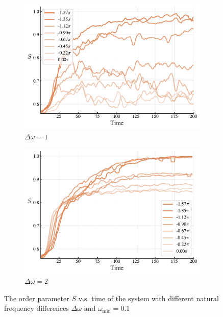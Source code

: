 \documentclass{article}
\begin{document}
\begin{figure}[H]
    \centering
    \begin{subfigure}{0.45\textwidth}
        \centering
        \includegraphics[width=1\textwidth]{figs/S_l0.15_d0.5_dO1_S.pdf}
        \caption{$\Delta \omega=1$}
    \end{subfigure}
    \begin{subfigure}{0.45\textwidth}
        \centering
        \includegraphics[width=1\textwidth]{figs/S_l0.15_d0.5_dO2_S.pdf}
        \caption{$\Delta \omega=2$}
    \end{subfigure}
    \caption{The order parameter $S$ v.s. time of the system with different natural frequency differences $\Delta \omega$ and $\omega_{\min}=0.1$}
\end{figure}
\end{document}
